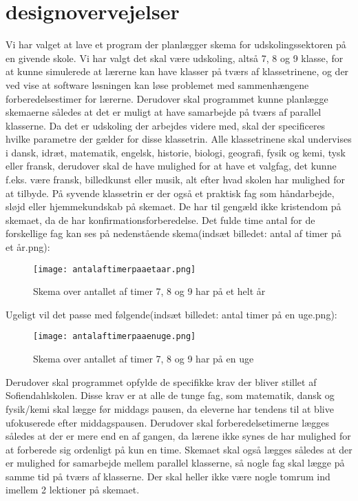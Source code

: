 \documentclass{article}
\begin{document}
\section{designovervejelser}
Vi har valget at lave et program der planlægger skema for udskolingssektoren på en givende skole. Vi har valgt det skal være udskoling, altså 7, 8 og 9 klasse, for at kunne simulerede at lærerne kan have klasser på tværs af klassetrinene, og der ved vise at software løsningen kan løse problemet med sammenhængene forberedelsestimer for lærerne. Derudover skal programmet kunne planlægge skemaerne således at det er muligt at have samarbejde på tværs af parallel klasserne.  Da det er udskoling der arbejdes videre med, skal der specificeres hvilke parametre der gælder for disse klassetrin. Alle klassetrinene skal undervises i dansk, idræt, matematik, engelsk, historie, biologi, geografi, fysik og kemi, tysk eller fransk, derudover skal de have mulighed for at have et valgfag, det kunne f.eks. være fransk, billedkunst eller musik, alt efter hvad skolen har mulighed for at tilbyde. På syvende klassetrin er der også et praktisk fag som håndarbejde, sløjd eller hjemmekundskab på skemaet. De har til gengæld ikke kristendom på skemaet, da de har konfirmationsforberedelse\cite{biblop1:16}. Det fulde time antal for de forskellige fag kan ses på nedenstående skema(indsæt billedet: antal af timer på et år.png):
\begin{figure}[h!]
\texttt{[image: antalaftimerpaaetaar.png]}
\caption{Skema over antallet af timer 7, 8 og 9 har på et helt år}
\label{Fig: XXX}
\end{figure}

Ugeligt vil det passe med følgende(indsæt billedet: antal timer på en uge.png):
\begin{figure}[h!]
\texttt{[image: antalaftimerpaaenuge.png]}
\caption{Skema over antallet af timer 7, 8 og 9 har på en uge}
\label{Fig: XXX2}
\end{figure}

Derudover skal programmet opfylde de specifikke krav der bliver stillet af Sofiendahlskolen. Disse krav er at alle de tunge fag, som matematik, dansk og fysik/kemi skal lægge før middags pausen, da eleverne har tendens til at blive ufokuserede efter middagspausen. 
Derudover skal forberedelsetimerne lægges således at der er mere end en af gangen, da lærene ikke synes de har mulighed for at forberede sig ordenligt på kun en time. Skemaet skal også lægges således at der er mulighed for samarbejde mellem parallel klasserne, så nogle fag skal lægge på samme tid på tværs af klasserne. 
Der skal heller ikke være nogle tomrum ind imellem 2 lektioner på skemaet\cite{biblop1:19}. 
\end{document}
